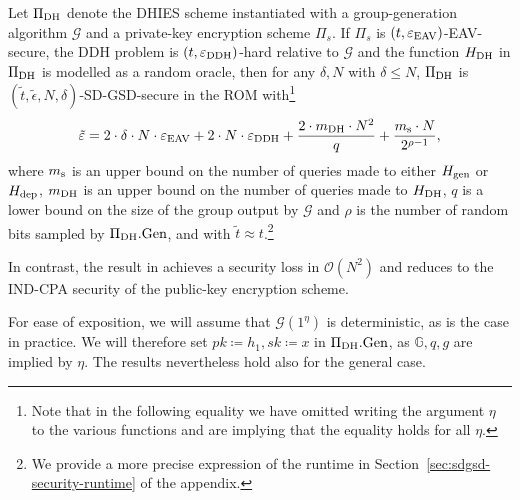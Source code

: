 \begin{theorem} \label{theorem:sdgsd-security}
	Let $\Pi_{\mathrm{DH}}$ denote the DHIES scheme instantiated with a group-generation algorithm $\mathcal{G}$ and a private-key encryption scheme $\Pi_s$. If $\Pi_s$ is $(t, \varepsilon_\mathrm{EAV})$-EAV-secure, the DDH problem is $(t, \varepsilon_\mathrm{DDH})$-hard relative to $\mathcal{G}$ and the function $H_\mathrm{DH}$ in $\Pi_{\mathrm{DH}}$ is modelled as a random oracle, then for any $\delta, N$ with $\delta \le N$, $\Pi_{\mathrm{DH}}$ is $(\tilde{t}, \tilde{\epsilon}, N, \delta)$-SD-GSD-secure in the ROM with\footnote{Note that in the following equality we have omitted writing the argument $\eta$ to the various functions and are implying that the equality holds for all $\eta$.}
	\[
		\tilde{\varepsilon} = 2 \cdot \delta \cdot N \cdot \varepsilon_\mathrm{EAV} + 2 \cdot N \cdot \varepsilon_\mathrm{DDH} + \frac{2 \cdot m_\mathrm{DH} \cdot N^2}{q} + \frac{m_\mathrm{s} \cdot N}{2^{\rho - 1}},
	\]
	where $m_\mathrm{s}$ is an upper bound on the number of queries made to either $H_\mathrm{gen}$ or $H_\mathrm{dep}$, $m_\mathrm{DH}$ is an upper bound on the number of queries made to $H_\mathrm{DH}$, $q$ is a lower bound on the size of the group output by $\mathcal{G}$ and $\rho$ is the number of random bits sampled by $\Pi_{\mathrm{DH}}.\mathrm{Gen}$, and with $\tilde{t} \approx t$.\footnote{We provide a more precise expression of the runtime in Section~\ref{sec:sdgsd-security-runtime} of the appendix.}
\end{theorem}

In contrast, the result in \cite{ttkem} achieves a security loss in $\mathcal{O}(N^2)$ and reduces to the IND-CPA security of the public-key encryption scheme.

For ease of exposition, we will assume that $\mathcal{G}(1^\eta)$ is deterministic, as is the case in practice. We will therefore set $pk \coloneqq h_1, sk \coloneqq x$ in $\Pi_{\mathrm{DH}}.\mathrm{Gen}$, as $\mathbb{G}, q, g$ are implied by $\eta$. The results nevertheless hold also for the general case.

